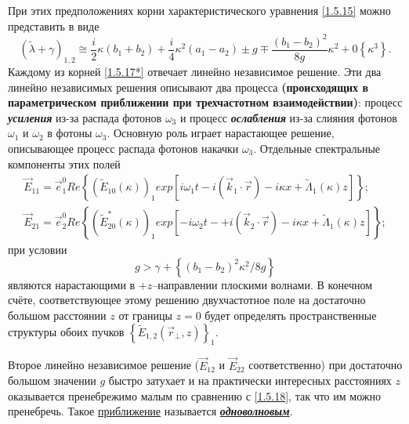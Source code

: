\documentclass[a4paper]{article}
\begin{document}
\begin{enumerate}
	При этих предположениях корни характеристического уравнения \eqref{1.5.15} можно представить в виде 
	\begin{equation}
		\left(\tilde{\lambda}+\gamma\right)_{1,2}\cong\frac{i}{2}\kappa(b_{1}+b_{2})+\frac{i}{4}\kappa^{2}(a_{1}-a_{2})\pm g\mp\frac{(b_{1}-b_{2})^{2}}{8g}\kappa^{2}+0\left\{\kappa^{3}\right\}.
		\label{1.5.17*}\tag{17*}
	\end{equation}
	Каждому из корней \eqref{1.5.17*} отвечает линейно независимое решение. Эти два линейно независимых решения описывают два процесса \textbf{(происходящих в параметрическом приближении при трехчастотном взаимодействии)}: процесс \textbf{\textit{усиления}} из-за распада фотонов $\omega_{3}$  и процесс \textbf{\textit{ослабления}} из-за слияния фотонов $\omega_{1}$ и $\omega_{2}$  в фотоны $\omega_{3}$. Основную роль играет нарастающее решение, описывающее процесс распада фотонов накачки $\omega_{3}$. Отдельные спектральные компоненты этих полей 
	\begin{equation}
		\begin{split}
			\vec{E}_{11}=\vec{e}_{1}^{0}Re\left\{\left(\tilde{E}_{10}(\kappa)\right)_{1}exp\left[i\omega_{1}t-i\left(\vec{k}_{1}\cdot\vec{r}\right)-i\kappa x+\tilde{\Lambda}_{1}(\kappa)z\right]\right\};\\
			\vec{E}_{21}=\vec{e}_{2}^{0}Re\left\{\left(\tilde{E}_{20}^{*}(\kappa)\right)_{1}exp\left[-i\omega_{2}t-+i\left(\vec{k}_{2}\cdot\vec{r}\right)-i\kappa x+\tilde{\Lambda}_{1}(\kappa)z\right]\right\};
		\end{split}
		\label{1.5.18}
	\end{equation}
	при условии
	\begin{equation}
		g>\gamma+\left\{(b_{1}-b_{2})^{2}\kappa^{2}/8g\right\}
		\label{1.5.19}
	\end{equation}
	являются нарастающими в  $+z$–направлении плоскими волнами. В конечном счёте, соответствующее этому решению двухчастотное поле на достаточно большом расстоянии $z$  от границы $z=0$  будет определять пространственные структуры обоих пучков $ \left\{\tilde{E}_{1,2}\left(\vec{r}_{\perp},z\right)\right\}_{1}$.
\end{enumerate}

	Второе линейно независимое решение ($\vec{E}_{12}$ и $\vec{E}_{22}$ соответственно) при достаточно большом значении  $g$  быстро затухает и на практически интересных расстояниях $z$  оказывается пренебрежимо малым по сравнению с \eqref{1.5.18}, так что им можно пренебречь. Такое  \underline{приближение} называется \underline{\textbf{\textit{одноволновым}}}. 
	
\end{document}
